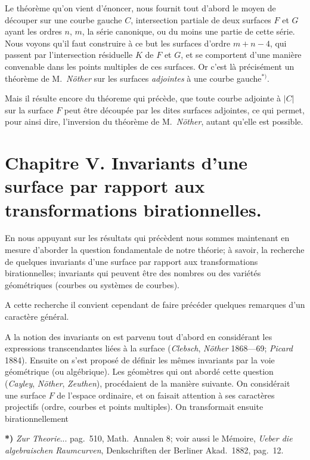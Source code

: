 \documentclass{article}
\begin{document}
Le théorème qu'on vient d'énoncer, nous fournit tout d'abord le moyen de découper sur une courbe gauche $C$, intersection partiale de deux surfaces $F$ et $G$ ayant les ordres $n$, $m$, la série canonique, ou du moins une partie de cette série. Nous voyons qu'il faut construire à ce but les surfaces d'ordre $m+n-4$, qui passent par l'intersection résiduelle $K$ de $F$ et $G$, et se comportent d'une manière convenable dans les points multiples de ces surfaces. Or c'est là précisément un théorème de M.\ \emph{Nöther} sur les surfaces \emph{adjointes} à une courbe gauche${}^{*)}$.

Mais il résulte encore du théoreme qui précède, que toute courbe adjointe à $|C|$ sur la surface $F$ peut être découpée par les dites surfaces adjointes, ce qui permet, pour ainsi dire, l'inversion du théorème de M.\ \emph{Nöther}, autant qu'elle est possible.

\section*{Chapitre V. Invariants d'une surface par rapport aux transformations birationnelles.}

En nous appuyant sur les résultats qui précèdent nous sommes maintenant en mesure d'aborder la question fondamentale de notre théorie; à savoir, la recherche de quelques invariants d'une surface par rapport aux transformations birationnelles; invariants qui peuvent être des nombres ou des variétés géométriques (courbes ou systèmes de courbes).

A cette recherche il convient cependant de faire précéder quelques remarques d'un caractère général.

A la notion des invariants on est parvenu tout d'abord en considérant les expressions transcendantes liées à la surface (\emph{Clebsch}, \emph{Nöther} 1868---69; \emph{Picard} 1884). Ensuite on s'est proposé de définir les mêmes invariants par la voie géométrique (ou algébrique). Les géomètres qui ont abordé cette question (\emph{Cayley}, \emph{Nöther}, \emph{Zeuthen}), procédaient de la manière suivante. On considérait une surface $F$ de l'espace ordinaire, et on faisait attention à ses caractères projectifs (ordre, courbes et points multiples). On transformait ensuite birationnellement

\textbf{*)} \emph{Zur Theorie}... pag.\ 510, Math.\ Annalen 8; voir aussi le Mémoire, \emph{Ueber die algebraischen Raumcurven}, Denkschriften der Berliner Akad.\ 1882, pag.\ 12.
\end{document}
